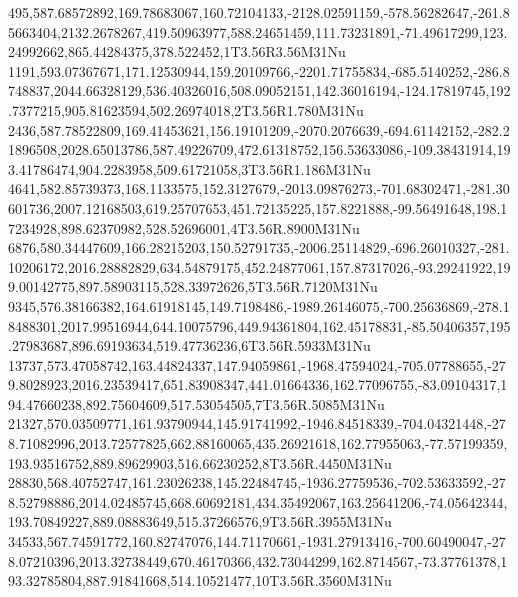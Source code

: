 495,587.68572892,169.78683067,160.72104133,-2128.02591159,-578.56282647,-261.85663404,2132.2678267,419.50963977,588.24651459,111.73231891,-71.49617299,123.24992662,865.44284375,378.522452,1T3.56R3.56M31Nu
1191,593.07367671,171.12530944,159.20109766,-2201.71755834,-685.5140252,-286.8748837,2044.66328129,536.40326016,508.09052151,142.36016194,-124.17819745,192.7377215,905.81623594,502.26974018,2T3.56R1.780M31Nu
2436,587.78522809,169.41453621,156.19101209,-2070.2076639,-694.61142152,-282.21896508,2028.65013786,587.49226709,472.61318752,156.53633086,-109.38431914,193.41786474,904.2283958,509.61721058,3T3.56R1.186M31Nu
4641,582.85739373,168.1133575,152.3127679,-2013.09876273,-701.68302471,-281.30601736,2007.12168503,619.25707653,451.72135225,157.8221888,-99.56491648,198.17234928,898.62370982,528.52696001,4T3.56R.8900M31Nu
6876,580.34447609,166.28215203,150.52791735,-2006.25114829,-696.26010327,-281.10206172,2016.28882829,634.54879175,452.24877061,157.87317026,-93.29241922,199.00142775,897.58903115,528.33972626,5T3.56R.7120M31Nu
9345,576.38166382,164.61918145,149.7198486,-1989.26146075,-700.25636869,-278.18488301,2017.99516944,644.10075796,449.94361804,162.45178831,-85.50406357,195.27983687,896.69193634,519.47736236,6T3.56R.5933M31Nu
13737,573.47058742,163.44824337,147.94059861,-1968.47594024,-705.07788655,-279.8028923,2016.23539417,651.83908347,441.01664336,162.77096755,-83.09104317,194.47660238,892.75604609,517.53054505,7T3.56R.5085M31Nu
21327,570.03509771,161.93790944,145.91741992,-1946.84518339,-704.04321448,-278.71082996,2013.72577825,662.88160065,435.26921618,162.77955063,-77.57199359,193.93516752,889.89629903,516.66230252,8T3.56R.4450M31Nu
28830,568.40752747,161.23026238,145.22484745,-1936.27759536,-702.53633592,-278.52798886,2014.02485745,668.60692181,434.35492067,163.25641206,-74.05642344,193.70849227,889.08883649,515.37266576,9T3.56R.3955M31Nu
34533,567.74591772,160.82747076,144.71170661,-1931.27913416,-700.60490047,-278.07210396,2013.32738449,670.46170366,432.73044299,162.8714567,-73.37761378,193.32785804,887.91841668,514.10521477,10T3.56R.3560M31Nu

